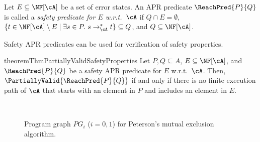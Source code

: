 \begin{definition}
	Let $E\subseteq \NF[\cA]$ be a set of error states.
	An APR predicate $\ReachPred{P}{Q}$ is called a \emph{safety predicate for $E$ w.r.t.\ $\cA$} if
	$Q \cap E = \emptyset$,
	$\{ t \in \NF[\cA] \setminus E \mid \exists s \in P.\ s \to_\cA^* t \} \subseteq Q$,
	and
	$Q \subseteq \NF[\cA]$.
\end{definition}

Safety APR predicates can be used for verification of safety properties.


\begin{restatable}{theorem}{ThmPartiallyValidSafetyProperties}
	\label{thm:partially-valid-safety-properties}
	Let $P, Q\subseteq A$, $E \subseteq \NF[\cA]$, and $\ReachPred{P}{Q}$ be a safety APR predicate for $E$ w.r.t.\ $\cA$. Then,
	$\PartiallyValid{\ReachPred{P}{Q}}$
	if and only if
	there is no finite execution path of $\cA$ that starts with an element in $P$ and includes an element in $E$.
\end{restatable}




\begin{figure}[t]
	\centering
	\\[5pt]
	\caption{Program graph $\mathit{PG}_i$ ($i=0,1$) for Peterson's mutual exclusion algorithm.}
	\label{fig:PG-Peterson}
\end{figure}


